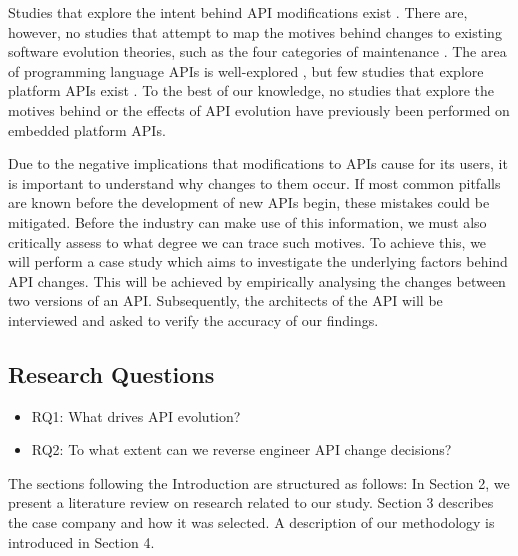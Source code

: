 \documentclass[10pt,twocolumn]{article}
\begin{document}
Studies that explore the intent behind API modifications exist \cite{hou2011exploring}. There are, however, no studies that attempt to map the motives behind changes to existing software evolution theories, such as the four categories of maintenance \cite{lientz1980software}. The area of programming language APIs is well-explored \cite{hou2011exploring} \cite{shi2011empirical}, but few studies that explore platform APIs exist \cite{robbes2012developers}. To the best of our knowledge, no studies that explore the motives behind or the effects of API evolution have previously been performed on embedded platform APIs. 

Due to the negative implications that modifications to APIs cause for its users, it is important to understand why changes to them occur. If most common pitfalls are known before the development of new APIs begin, these mistakes could be mitigated. Before the industry can make use of this information, we must also critically assess to what degree we can trace such motives. To achieve this, we will perform a case study which aims to investigate the underlying factors behind API changes. This will be achieved by empirically analysing the changes between two versions of an API. Subsequently, the architects of the API will be interviewed and asked to verify the accuracy of our findings. 



\subsection{Research Questions}
\begin{itemize}
\item RQ1: What drives API evolution? 
\item RQ2: To what extent can we reverse engineer API change decisions?
\end{itemize}

The sections following the Introduction are structured as follows: In Section 2, we present a literature review on research related to our study. Section 3 describes the case company and how it was selected. A description of our methodology is introduced in Section 4. 
\end{document}
